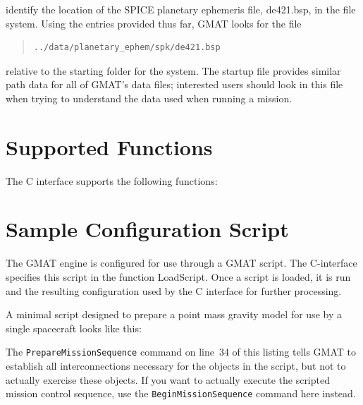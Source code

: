 \documentclass[letterpaper,10pt]{article}
\begin{document}
\noindent identify the location of the SPICE planetary ephemeris file, de421.bsp, in the file system.  Using the entries provided thus far, GMAT looks for the file

\begin{quote}
\begin{verbatim}
../data/planetary_ephem/spk/de421.bsp
\end{verbatim}
\end{quote}

\noindent relative to the starting folder for the system.  The startup file provides similar path data for all of GMAT's data files; interested users should look in this file when trying to understand the data used when running a mission.

\section{\label{sec:FunctionList}Supported Functions}

The C interface supports the following functions:

\begin{quote}

\end{quote} 

\section{\label{sec:SampleConfigurationScript}Sample Configuration Script}

The GMAT engine is configured for use through a GMAT script.  The C-interface specifies this script in the function LoadScript.  Once a script is loaded, it is run and the resulting configuration used by the C interface for further processing.  

A minimal script designed to prepare a point mass gravity model for use by a single spacecraft looks like this:

\begin{quote}
\lstset{numbers=left, numberstyle=\tiny}

\end{quote}

\noindent The \texttt{PrepareMissionSequence} command on line~34 of this listing tells GMAT to establish all interconnections necessary for the objects in the script, but not to actually exercise these objects.  If you want to actually execute the scripted mission control sequence, use the \texttt{BeginMissionSequence} command here instead.
\end{document}
